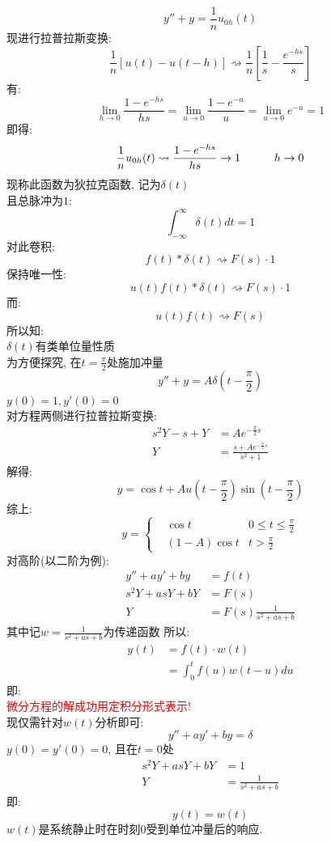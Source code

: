 \[ y'' + y = \frac{1}{n} u_{0h}(t) \]
现进行拉普拉斯变换:
\[ \frac{1}{n} [u(t) - u(t-h)] \rightsquigarrow \frac{1}{n} [\frac{1}{s} - \frac{e^{-hs}}{s}] \]
有:
\[ \lim_{h \to 0}  \frac{1-e^{-hs}}{hs} = \lim_{u \to 0} \frac{1-e^{-u}}{u} = \lim_{u \to 0} e^{-u} = 1  \]
即得:
\[ \frac{1}{n} u_{0h}(t) \rightsquigarrow   \frac{1-e^{-hs}}{hs} \to 1  \hspace*{3em} h \to 0 \]
现称此函数为狄拉克函数, 记为$\delta (t)$\\
且总脉冲为$1$:
\[
   \int_{-\infty}^\infty \delta (t) dt = 1
\]
对此卷积:
\[
    f(t) \ast  \delta (t) \rightsquigarrow F(s)\cdot 1
\]
保持唯一性:
\[ u(t) f(t) \ast  \delta (t) \rightsquigarrow F(s)\cdot 1 \]
而:
\[ u(t) f(t) \rightsquigarrow F(s) \]
所以知:\\
$\delta (t)$有类单位量性质\\
为方便探究, 在$t=\frac{\pi}{2}$处施加冲量
\[ y'' + y = A \delta (t-\frac{\pi}{2}) \]
$y(0) = 1, y'(0) = 0$\\
对方程两侧进行拉普拉斯变换:
\begin{align*}
   s^2 Y - s + Y &= A e^{-\frac{\pi}{2}s} \\
   Y &= \frac{s + Ae^{-\frac{\pi}{2}s}}{s^2 + 1}
\end{align*}
解得:
\[ y = \cos t + A u(t-\frac{\pi}{2}) \sin (t - \frac{\pi}{2}) \]
综上:
\[
 y = \left\{
\begin{aligned}
   &\cos t   & 0 \leq t \leq \frac{\pi}{2}\\
   &(1-A)\cos t  & t >  \frac{\pi}{2}
\end{aligned}
\right.
\]
对高阶(以二阶为例):
\begin{align*}
   y'' + ay' + by &= f(t) \\
   s^2 Y + as Y + b Y &= F(s) \\
   Y &= F(s) \frac{1}{s^2 + a s + b}
\end{align*}
其中记$w = \frac{1}{s^2 + a s + b}$为传递函数
所以:
\begin{align*}
   y(t) &= f(t) \cdot w(t) \\
   &= \int_0^t f(u) w(t-u) du
\end{align*}
即:\\
\textcolor{red}{微分方程的解成功用定积分形式表示!}\\
现仅需针对$w(t)$分析即可:
\[ y'' + ay' + by = \delta  \]
$y(0) = y'(0) = 0$, 且在$t=0$处
\begin{align*}
   s^2 Y + as Y + b Y &= 1 \\
   Y &= \frac{1}{s^2 + a s + b}
\end{align*}
即:
\[ y(t) = w(t) \]
$w(t)$是系统静止时在时刻$0$受到单位冲量后的响应.
